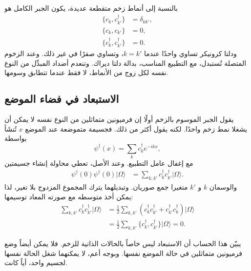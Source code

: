 بالنسبة إلى أنماط زخم متقطعة عديدة، يكون الجبر الكامل هو
\begin{align}
\{c_k,c_{k'}^\dagger\}&=\delta_{kk'},
\\
\{c_k,c_{k'}\}&=0,
\\
\{c_k^\dagger,c_{k'}^\dagger\}&=0.
\end{align}
ودلتا كرونيكر تساوي واحدًا عندما \(k=k'\)، وتساوي صفرًا في غير ذلك. وعند الزخوم المتصلة تُستبدل، مع التطبيع المناسب، بدالة دلتا ديراك. وتنعدم أضداد المبدِّل من النوع نفسه لكل زوج من الأنماط، لا فقط عندما تتطابق وسومها.

\subsection{الاستبعاد في فضاء الموضع}

يقول الجبر الموسوم بالزخم أولًا إن فرميونين متماثلين من النوع نفسه لا يمكن أن يشغلا نمط زخم واحدًا. لكنه يقول أكثر من ذلك. فجسيمة متموضعة عند الموضع \(x\) تُنشَأ بواسطة
\begin{equation}
\psi^\dagger(x)=\sum_k c_k^\dagger e^{-ikx},
\end{equation}
مع إغفال عامل التطبيع. وعند الأصل، تعطي محاولة إنشاء جسيمتين
\begin{align}
\psi^\dagger(0)\psi^\dagger(0)|\Omega\rangle
&=\sum_{k,k'}c_k^\dagger c_{k'}^\dagger|\Omega\rangle.
\end{align}
والوسمان \(k\) و \(k'\) متغيرا جمع صوريان. وتبديلهما يترك المجموع المزدوج بلا تغير، لذا يمكن أخذ متوسطه مع صورته المعاد توسيمها:
\begin{align}
\sum_{k,k'}c_k^\dagger c_{k'}^\dagger|\Omega\rangle
&=\frac12\sum_{k,k'}
\left(c_k^\dagger c_{k'}^\dagger
+c_{k'}^\dagger c_k^\dagger\right)|\Omega\rangle
\\
&=\frac12\sum_{k,k'}
\{c_k^\dagger,c_{k'}^\dagger\}|\Omega\rangle
=0.
\end{align}

\begin{classroomqa}
\end{classroomqa}

يبيّن هذا الحساب أن الاستبعاد ليس خاصاً بالحالات الذاتية للزخم. فلا يمكن أيضاً وضع فرميونين متماثلين في حالة الموضع نفسها. وبوجه أعم، لا يمكنهما شغل الحالة نفسها لجسيم واحد، أياً كانت.

